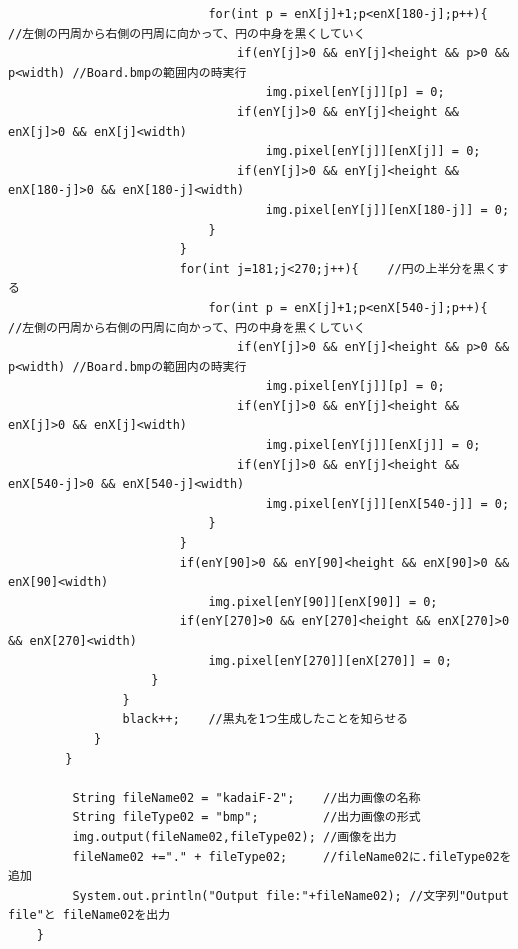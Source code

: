 \documentclass{jsarticle}
\begin{document}
\begin{verbatim}
                            for(int p = enX[j]+1;p<enX[180-j];p++){     //左側の円周から右側の円周に向かって、円の中身を黒くしていく
                                if(enY[j]>0 && enY[j]<height && p>0 && p<width) //Board.bmpの範囲内の時実行
                                    img.pixel[enY[j]][p] = 0;
                                if(enY[j]>0 && enY[j]<height && enX[j]>0 && enX[j]<width)
                                    img.pixel[enY[j]][enX[j]] = 0;
                                if(enY[j]>0 && enY[j]<height && enX[180-j]>0 && enX[180-j]<width)
                                    img.pixel[enY[j]][enX[180-j]] = 0;
                            }
                        }
                        for(int j=181;j<270;j++){    //円の上半分を黒くする
                            for(int p = enX[j]+1;p<enX[540-j];p++){     //左側の円周から右側の円周に向かって、円の中身を黒くしていく
                                if(enY[j]>0 && enY[j]<height && p>0 && p<width) //Board.bmpの範囲内の時実行
                                    img.pixel[enY[j]][p] = 0;
                                if(enY[j]>0 && enY[j]<height && enX[j]>0 && enX[j]<width)
                                    img.pixel[enY[j]][enX[j]] = 0;
                                if(enY[j]>0 && enY[j]<height && enX[540-j]>0 && enX[540-j]<width)
                                    img.pixel[enY[j]][enX[540-j]] = 0;
                            }
                        }
                        if(enY[90]>0 && enY[90]<height && enX[90]>0 && enX[90]<width)
                            img.pixel[enY[90]][enX[90]] = 0;
                        if(enY[270]>0 && enY[270]<height && enX[270]>0 && enX[270]<width)
                            img.pixel[enY[270]][enX[270]] = 0;
                    }
                }
                black++;    //黒丸を1つ生成したことを知らせる
            }
        }

	     String fileName02 = "kadaiF-2";    //出力画像の名称
	     String fileType02 = "bmp";         //出力画像の形式
	     img.output(fileName02,fileType02); //画像を出力
	     fileName02 +="." + fileType02;     //fileName02に.fileType02を追加
	     System.out.println("Output file:"+fileName02); //文字列"Output file"と fileName02を出力
	}
\end{verbatim}

\end{document}
